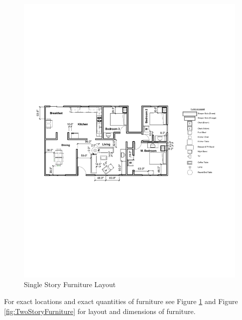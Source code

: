 \documentclass{article}
\begin{document}
\begin{figure}[H]
	\centering
	\includegraphics[width=\textwidth]{0_Images/Furniture/Single_Story_Furniture_Layout.pdf}
	\caption{Single Story Furniture Layout}
	\label{fig:SingleStoryFurniture}
\end{figure}

For exact locations and exact quantities of furniture see Figure \ref{fig:SingleStoryFurniture} and Figure \ref{fig:TwoStoryFurniture} for layout and dimensions of furniture. 
\end{document}
